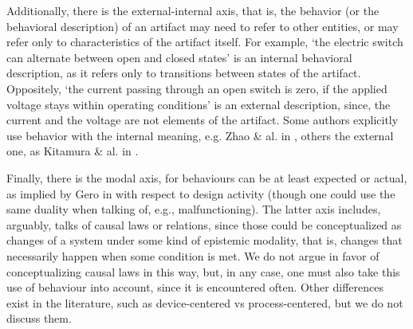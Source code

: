 \documentclass[sw]{iosart2x}
\newcommand{\TODO}[1]{{\color{red} #1}}
\begin{document}
{Additionally, there is the external-internal axis, that is, the behavior (or the behavioral description) of an artifact may need to refer to other entities, or may refer only to characteristics of the artifact itself.
For example, `the electric switch can alternate between open and closed states' is an internal behavioral description, as it refers only to transitions between states of the artifact.
Oppositely, `the current passing through an open switch is zero, if the applied voltage stays within operating conditions' is an external description, since, the current and the voltage are not elements of the artifact. %
Some authors explicitly use behavior with the internal meaning, e.g. Zhao \& al. in \cite{zhaoStateBehaviorFunction2019}, others the external one, as Kitamura \& al. in \cite{kitamuraOntologybasedSystematizationFunctional2004}.

Finally, there is the modal axis, for behaviours can be at least expected or actual, as implied by Gero in \cite{geroSituatedFunctionBehaviour2004} with respect to design activity (though one could use the same duality when talking of, e.g., malfunctioning).
The latter axis includes, arguably, talks of causal laws or relations, since those could be conceptualized as changes of a system under some kind of epistemic modality, that is, changes that necessarily happen when some condition is met.
We do not argue in favor of conceptualizing causal laws in this way, but, in any case, one must also take this use of behaviour into account, since it is encountered often.
Other differences exist in the literature, such as device-centered vs process-centered, but we do not discuss them. 

}
\end{document}
